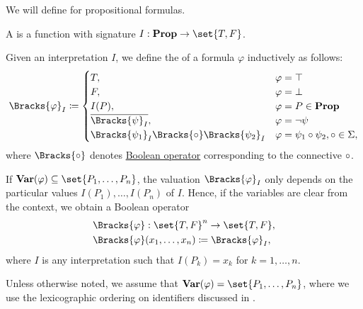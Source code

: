 \begin{definition}\label{def:propositional_valuation}
  We will define  for propositional formulas.

  \begin{thmenum}
     A  is a function with signature \( I: \boldop{Prop} \to \set{ T, F } \).

    \medskip

     Given an interpretation \( I \), we define the  of a formula \( \varphi \) inductively as follows:
    \begin{equation}\label{eq:def:propositional_valuation/formula_interpretation}
      \Bracks{\varphi}_I \coloneqq \begin{cases}
        T,                                                                &\varphi = \top \\
        F,                                                                &\varphi = \bot \\
        I(P),                                                             &\varphi = P \in \boldop{Prop} \\
        \overline{\Bracks{\psi}_I},                                       &\varphi = \neg \psi \\
        \Bracks{\psi_1}_I \Bracks{\bincirc} \Bracks{\psi_2}_I &\varphi = \psi_1 \bincirc \psi_2, \bincirc \in \Sigma,
      \end{cases}
    \end{equation}
    where \( \Bracks{\bincirc} \) denotes \hyperref[def:standard_boolean_operators]{Boolean operator} corresponding to the connective \( \bincirc \).

     If \( \boldop{Var}(\varphi) \subseteq \set{ P_1, \ldots, P_n } \), the valuation \( \Bracks{\varphi}_I \) only depends on the particular values \( I(P_1), \ldots, I(P_n) \) of \( I \). Hence, if the variables are clear from the context, we obtain a Boolean operator
    \begin{equation*}
      \begin{aligned}
        &\Bracks{\varphi}: \set{ T, F }^n \to \set{ T, F }, \\
        &\Bracks{\varphi}(x_1, \ldots, x_n) \coloneqq \Bracks{\varphi}_I,
      \end{aligned}
    \end{equation*}
    where \( I \) is any interpretation such that \( I(P_k) = x_k \) for \( k = 1, \ldots, n \).

    Unless otherwise noted, we assume that \( \boldop{Var}(\varphi) = \set{ P_1, \ldots, P_n } \), where we use the lexicographic ordering on identifiers discussed in .
  \end{thmenum}
\end{definition}
